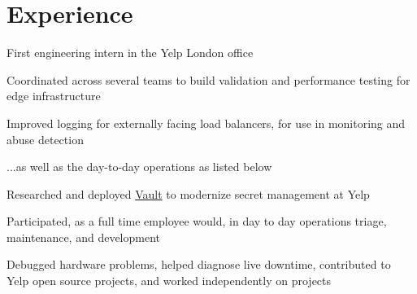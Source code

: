 \documentclass[letterpaper]{deedy-resume} %
\begin{document}
\begin{minipage}[t]{0.66\textwidth} %


\section{Experience}


\vspace{\topsep} %

\begin{tightitemize}
\item First engineering intern in the Yelp London office
\item Coordinated across several teams to build validation and performance
  testing for edge infrastructure
\item Improved logging for externally facing load balancers, for use in monitoring
  and abuse detection
\item ...as well as the day-to-day operations as listed below
\end{tightitemize}

\sectionspace %




\begin{tightitemize}
\item Researched and deployed \href{https://vaultproject.io}{Vault} to modernize secret management at Yelp
\item Participated, as a full time employee would, in day to day operations
  triage, maintenance, and development
\item Debugged hardware problems, helped diagnose live downtime,
  contributed to Yelp open source projects, and worked independently on projects
\end{tightitemize}

\sectionspace %


\end{minipage}
\end{document}
